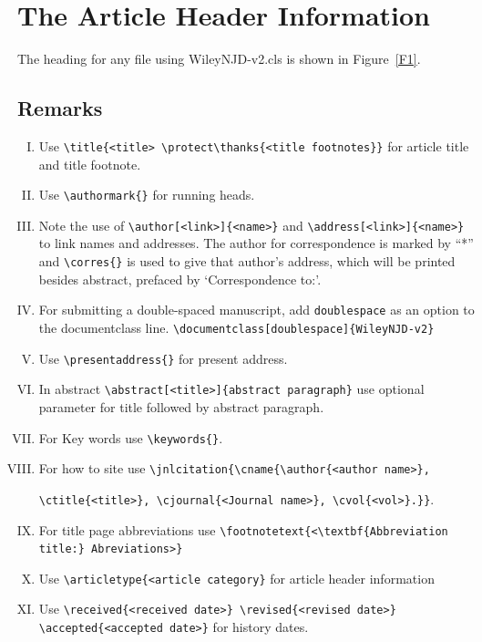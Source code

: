 \documentclass[AMA,STIX1COL]{WileyNJD-v2}
\begin{document}
\section{The Article Header Information}
The heading for any file using \textsf{WileyNJD-v2.cls} is shown in
Figure~\ref{F1}.

\subsection{Remarks}

\begin{enumerate}[(I).]

\item Use \verb"\title{<title> \protect\thanks{<title footnotes}}" for article title and title footnote.
\item Use \verb"\authormark{}" for running heads.

\item Note the use of \verb"\author[<link>]{<name>}" and \verb"\address[<link>]{<name>}" to
link names and addresses. The author for correspondence is marked
by ``*'' and \verb"\corres{}" is used to give that
author's address, which will be printed besides abstract, prefaced by
`Correspondence to:'.

\item For submitting a double-spaced manuscript, add
\verb"doublespace" as an option to the documentclass line. \verb"\documentclass[doublespace]{WileyNJD-v2}"

\item Use \verb"\presentaddress{}" for present address.

\item In abstract \verb"\abstract[<title>]{abstract paragraph}" use optional parameter for title followed by abstract paragraph.

\item For Key words use \verb"\keywords{}".

\item For how to site use \verb"\jnlcitation{\cname{\author{<author name>},"

\verb"\ctitle{<title>}, \cjournal{<Journal name>}, \cvol{<vol>}.}}".

\item For title page abbreviations use \verb"\footnotetext{<\textbf{Abbreviation title:} Abreviations>}"

\item Use \verb"\articletype{<article category}" for article header information

\item Use \verb"\received{<received date>} \revised{<revised date>} \accepted{<accepted date>}" for history dates.

\end{enumerate}
\end{document}
